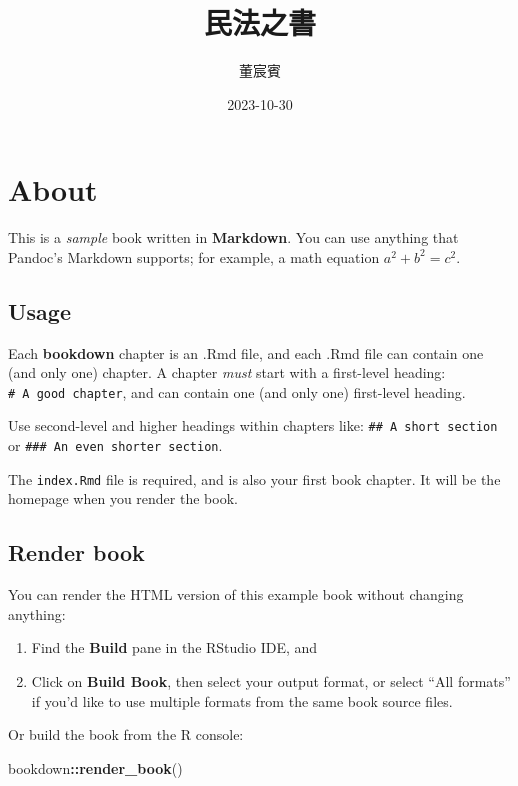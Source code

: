 \documentclass[
]{book}
\title{民法之書}
\author{董宸賓}
\date{2023-10-30}
\newenvironment{Shaded}{\begin{snugshade}}{\end{snugshade}}
\newcommand{\FunctionTok}[1]{\textcolor[rgb]{0.13,0.29,0.53}{\textbf{#1}}}
\newcommand{\NormalTok}[1]{#1}
\newcommand{\SpecialCharTok}[1]{\textcolor[rgb]{0.81,0.36,0.00}{\textbf{#1}}}
\begin{document}
\maketitle

{
\setcounter{tocdepth}{1}
\tableofcontents
}
\hypertarget{about}{%
\chapter{About}\label{about}}

This is a \emph{sample} book written in \textbf{Markdown}. You can use anything that Pandoc's Markdown supports; for example, a math equation \(a^2 + b^2 = c^2\).

\hypertarget{usage}{%
\section{Usage}\label{usage}}

Each \textbf{bookdown} chapter is an .Rmd file, and each .Rmd file can contain one (and only one) chapter. A chapter \emph{must} start with a first-level heading: \texttt{\#\ A\ good\ chapter}, and can contain one (and only one) first-level heading.

Use second-level and higher headings within chapters like: \texttt{\#\#\ A\ short\ section} or \texttt{\#\#\#\ An\ even\ shorter\ section}.

The \texttt{index.Rmd} file is required, and is also your first book chapter. It will be the homepage when you render the book.

\hypertarget{render-book}{%
\section{Render book}\label{render-book}}

You can render the HTML version of this example book without changing anything:

\begin{enumerate}
\def\labelenumi{\arabic{enumi}.}
\item
  Find the \textbf{Build} pane in the RStudio IDE, and
\item
  Click on \textbf{Build Book}, then select your output format, or select ``All formats'' if you'd like to use multiple formats from the same book source files.
\end{enumerate}

Or build the book from the R console:

\begin{Shaded}
\begin{Highlighting}[]
\NormalTok{bookdown}\SpecialCharTok{::}\FunctionTok{render\_book}\NormalTok{()}
\end{Highlighting}
\end{Shaded}
\end{document}

